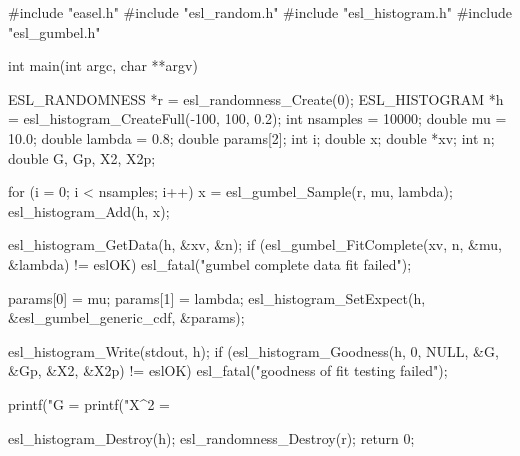\begin{cchunk}
#include "easel.h"
#include "esl_random.h"
#include "esl_histogram.h"
#include "esl_gumbel.h"

int
main(int argc, char **argv)
{
  ESL_RANDOMNESS *r  = esl_randomness_Create(0);
  ESL_HISTOGRAM  *h  = esl_histogram_CreateFull(-100, 100, 0.2);
  int     nsamples    = 10000;
  double  mu          = 10.0;
  double  lambda      = 0.8;
  double  params[2];
  int     i;
  double  x;
  double *xv;
  int     n;
  double  G, Gp, X2, X2p;

  for (i = 0; i < nsamples; i++) {
    x = esl_gumbel_Sample(r, mu, lambda);
    esl_histogram_Add(h, x);
  }

  esl_histogram_GetData(h, &xv, &n);
  if (esl_gumbel_FitComplete(xv, n, &mu, &lambda) != eslOK)
    esl_fatal("gumbel complete data fit failed");

  params[0] = mu;
  params[1] = lambda;
  esl_histogram_SetExpect(h, &esl_gumbel_generic_cdf, &params);

  esl_histogram_Write(stdout, h);
  if (esl_histogram_Goodness(h, 0, NULL, &G, &Gp, &X2, &X2p) != eslOK)
    esl_fatal("goodness of fit testing failed");

  printf("G   = %
  printf("X^2 = %

  esl_histogram_Destroy(h);
  esl_randomness_Destroy(r);
  return 0;
}
\end{cchunk}
